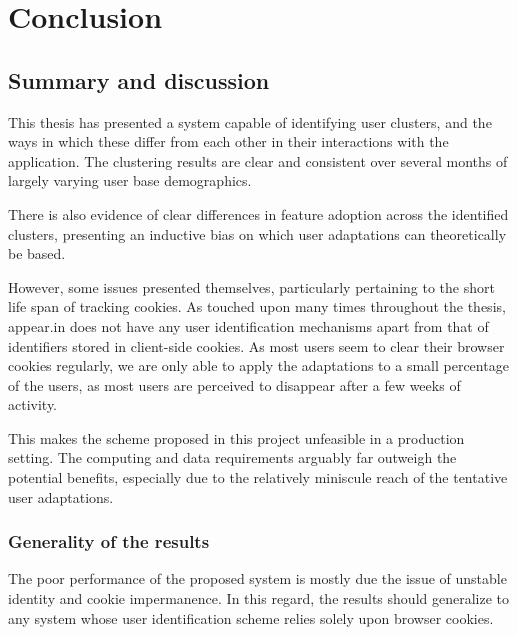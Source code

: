 \chapter{Conclusion}

\label{Chapter5}



\section{Summary and discussion} %
\label{conclusion:summary_and_discussion}

  This thesis has presented a system capable of identifying user clusters, and the ways in which these differ from each other in their interactions with the application. The clustering results are clear and consistent over several months of largely varying user base demographics.

  There is also evidence of clear differences in feature adoption across the identified clusters, presenting an inductive bias on which user adaptations can theoretically be based.

  However, some issues presented themselves, particularly pertaining to the short life span of tracking cookies. As touched upon many times throughout the thesis, appear.in does not have any user identification mechanisms apart from that of identifiers stored in client-side cookies. As most users seem to clear their browser cookies regularly, we are only able to apply the adaptations to a small percentage of the users, as most users are perceived to disappear after a few weeks of activity.

  This makes the scheme proposed in this project unfeasible in a production setting. The computing and data requirements arguably far outweigh the potential benefits, especially due to the relatively miniscule reach of the tentative user adaptations.

  \subsection{Generality of the results}
  \label{conclusion:result_generality}

    The poor performance of the proposed system is mostly due the issue of unstable identity and cookie impermanence. In this regard, the results should generalize to any system whose user identification scheme relies solely upon browser cookies.

